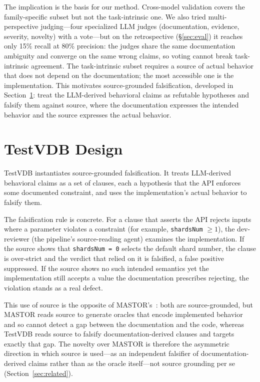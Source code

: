\documentclass[sigconf]{acmart}
\begin{document}
The implication is the basis for our method. Cross-model validation covers the family-specific subset but not the task-intrinsic one. We also tried multi-perspective judging---four specialized LLM judges (documentation, evidence, severity, novelty) with a vote---but on the retrospective (\S\ref{sec:eval}) it reaches only 15\% recall at 80\% precision: the judges share the same documentation ambiguity and converge on the same wrong claims, so voting cannot break task-intrinsic agreement. The task-intrinsic subset requires a source of actual behavior that does not depend on the documentation; the most accessible one is the implementation. This motivates source-grounded falsification, developed in Section~\ref{sec:design}: treat the LLM-derived behavioral claims as refutable hypotheses and falsify them against source, where the documentation expresses the intended behavior and the source expresses the actual behavior.

\section{TestVDB Design} \label{sec:design}

TestVDB instantiates source-grounded falsification. It treats LLM-derived behavioral claims as a set of clauses, each a hypothesis that the API enforces some documented constraint, and uses the implementation's actual behavior to falsify them.

The falsification rule is concrete. For a clause that asserts the API rejects inputs where a parameter violates a constraint (for example, \texttt{shardsNum} $\geq 1$), the dev-reviewer (the pipeline's source-reading agent) examines the implementation. If the source shows that \texttt{shardsNum = 0} selects the default shard number, the clause is over-strict and the verdict that relied on it is falsified, a false positive suppressed. If the source shows no such intended semantics yet the implementation still accepts a value the documentation prescribes rejecting, the violation stands as a real defect.

This use of source is the opposite of MASTOR's~\cite{mastor26}: both are source-grounded, but MASTOR reads source to generate oracles that encode implemented behavior and so cannot detect a gap between the documentation and the code, whereas TestVDB reads source to falsify documentation-derived clauses and targets exactly that gap. The novelty over MASTOR is therefore the asymmetric direction in which source is used---as an independent falsifier of documentation-derived claims rather than as the oracle itself---not source grounding per se (Section~\ref{sec:related}).
\end{document}
